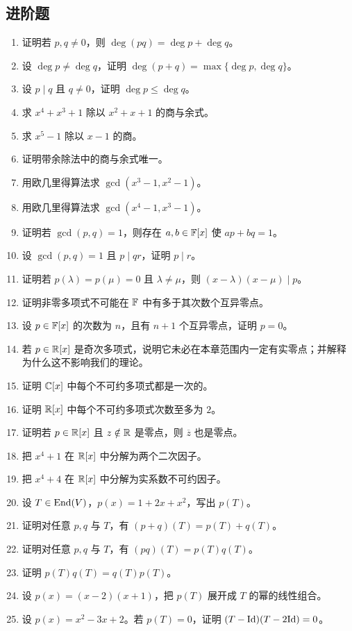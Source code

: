 \subsection*{进阶题}
\begin{enumerate}[resume, label=\textbf{\arabic*.}, leftmargin=*, itemsep=0.5em]
\item \medium 证明若 $p,q\neq 0$，则 $\deg(pq)=\deg p+\deg q$。
\item \medium 设 $\deg p\neq \deg q$，证明 $\deg(p+q)=\max\{\deg p,\deg q\}$。
\item \medium 设 $p\mid q$ 且 $q\neq 0$，证明 $\deg p\le \deg q$。
\item \medium 求 $x^4+x^3+1$ 除以 $x^2+x+1$ 的商与余式。
\item \medium 求 $x^5-1$ 除以 $x-1$ 的商。
\item \medium 证明带余除法中的商与余式唯一。
\item \medium 用欧几里得算法求 $\gcd(x^3-1,x^2-1)$。
\item \medium 用欧几里得算法求 $\gcd(x^4-1,x^3-1)$。
\item \medium 证明若 $\gcd(p,q)=1$，则存在 $a,b\in\mathbb{F}[x]$ 使 $ap+bq=1$。
\item \medium 设 $\gcd(p,q)=1$ 且 $p\mid qr$，证明 $p\mid r$。
\item \medium 证明若 $p(\lambda)=p(\mu)=0$ 且 $\lambda\neq \mu$，则 $(x-\lambda)(x-\mu)\mid p$。
\item \medium 证明非零多项式不可能在 $\mathbb{F}$ 中有多于其次数个互异零点。
\item \medium 设 $p\in\mathbb{F}[x]$ 的次数为 $n$，且有 $n+1$ 个互异零点，证明 $p=0$。
\item \medium 若 $p\in\mathbb{R}[x]$ 是奇次多项式，说明它未必在本章范围内一定有实零点；并解释为什么这不影响我们的理论。
\item \medium 证明 $\mathbb{C}[x]$ 中每个不可约多项式都是一次的。
\item \medium 证明 $\mathbb{R}[x]$ 中每个不可约多项式次数至多为 $2$。
\item \medium 证明若 $p\in\mathbb{R}[x]$ 且 $z\notin\mathbb{R}$ 是零点，则 $\overline z$ 也是零点。
\item \medium 把 $x^4+1$ 在 $\mathbb{R}[x]$ 中分解为两个二次因子。
\item \medium 把 $x^4+4$ 在 $\mathbb{R}[x]$ 中分解为实系数不可约因子。
\item \medium 设 $T\in\mathrm{End}(V)$，$p(x)=1+2x+x^2$，写出 $p(T)$。
\item \medium 证明对任意 $p,q$ 与 $T$，有 $(p+q)(T)=p(T)+q(T)$。
\item \medium 证明对任意 $p,q$ 与 $T$，有 $(pq)(T)=p(T)q(T)$。
\item \medium 证明 $p(T)q(T)=q(T)p(T)$。
\item \medium 设 $p(x)=(x-2)(x+1)$，把 $p(T)$ 展开成 $T$ 的幂的线性组合。
\item \medium 设 $p(x)=x^2-3x+2$。若 $p(T)=0$，证明 $(T-\mathrm{Id})(T-2\mathrm{Id})=0$。
\end{enumerate}

